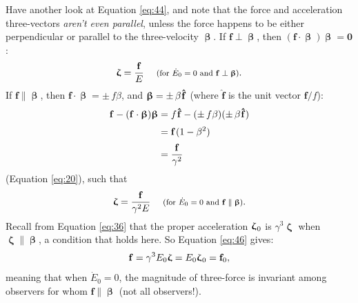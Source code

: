 \documentclass[12pt]{article}
\renewcommand{\vv}[1]{\mathbf{#1}}
\newcommand{\vvbeta}{\bm{\upbeta}}
\newcommand{\vvzeta}{\bm{\upzeta}}
\begin{document}
Have another look at Equation \ref{eq:44}, and note that the force and acceleration three-vectors \emph{aren't even parallel}, unless the force happens to be either perpendicular or parallel to the three-velocity $\vvbeta$. If $\vv f \perp \vvbeta$, then $(\vv f \cdot \vvbeta) \vvbeta = \vv 0$:
\begin{equation}\label{eq:45}
\vvzeta = \frac{\vv f}{E} \quad \textrm{\footnotesize{ (for $\dot{E}_0 = 0$ and $\vv f \perp \vvbeta$)}}.
\end{equation}
If $\vv f \parallel \vvbeta$, then $\vv f \cdot \vvbeta = \pm \, f \beta$, and $\vvbeta = \pm \, \beta \mkern1mu \vv{\hat{f}}$ (where $\vv{\hat{f}}$ is the unit vector $\vv f / f$):
\begin{equation*}
\begin{split}
\vv f - (\vv f \cdot \vvbeta) \vvbeta &= f \mkern1mu \vv{\hat{f}} - (\pm \, f \beta) (\pm \, \beta \mkern1mu \vv{\hat{f}}) \\[2pt]
&= \vv f \mkern1mu (1 - \beta^2) \\[2pt]
&= \frac{\vv f}{\gamma^2}
\end{split}
\end{equation*}
(Equation \ref{eq:20}), such that
\begin{equation}\label{eq:46}
\vvzeta = \frac{\vv f}{\gamma^2 E} \quad \textrm{\footnotesize{ (for $\dot{E}_0 = 0$ and $\vv f \parallel \vvbeta$)}}.
\end{equation}
Recall from Equation \ref{eq:36} that the proper acceleration $\vvzeta_{\mkern1mu 0}$ is $\gamma^3 \vvzeta$ when $\vvzeta \parallel \vvbeta$, a condition that holds here. So Equation \ref{eq:46} gives:
\begin{equation*}
\vv f = \gamma^3 E_0 \vvzeta = E_0 \vvzeta_{\mkern1mu 0} = \vv f_0 ,
\end{equation*}
meaning that when $\dot{E}_0 = 0$, the magnitude of three-force is invariant among observers for whom $\vv f \parallel \vvbeta$ (not all observers!).
\end{document}

